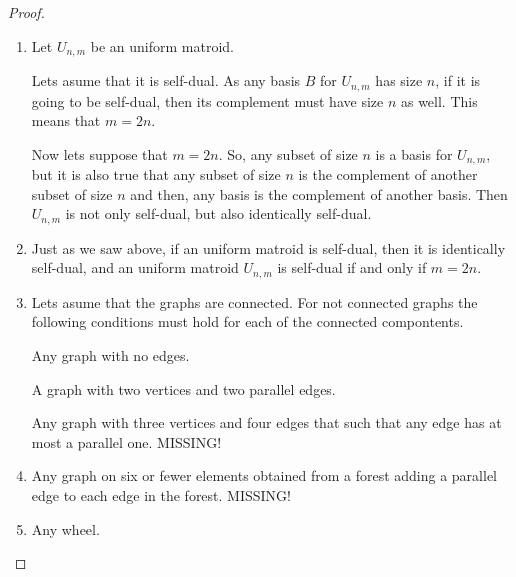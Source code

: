 \begin{proof}$\,$\pn
    \begin{enumerate}[label=(\roman*)]
        \item 
            Let $U_{n,m}$ be an uniform matroid.\pn
            
            Lets asume that it is self-dual. As
            any basis $B$ for $U_{n,m}$ has size $n$, if it is going to be self-dual,
            then its complement must have size $n$ as well. This means that $m = 2n$.\pn
            
            Now lets suppose that $m = 2n$. So, any subset of size $n$ is a basis for $U_{n,m}$,
            but it is also true that any subset of size $n$ is the complement of another subset
            of size $n$ and then, any basis is the complement of another basis. Then $U_{n,m}$ is
            not only self-dual, but also identically self-dual.
        \item 
            Just as we saw above, if an uniform matroid is self-dual, then it is identically self-dual, and
            an uniform matroid $U_{n,m}$ is self-dual if and only if $m = 2n$.
        \item 
            Lets asume that the graphs are connected. For not connected graphs the following conditions
            must hold for each of the connected compontents.\pn
            
            Any graph with no edges.\pn
            
            A graph with two vertices and two parallel edges.\pn
            
            Any graph with three vertices and four edges that such that any edge has at most
            a parallel one.\pn
            MISSING!
            
        \item 
            Any graph on six or fewer elements obtained from a forest adding a parallel edge to each edge in the forest.
            MISSING!
            
        \item 
            Any wheel.
    \end{enumerate}
\end{proof}